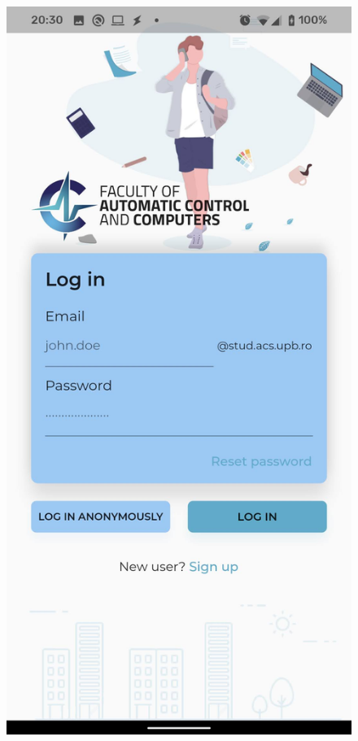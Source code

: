 \begin{figure}[!ht]
    \centering
    \begin{minipage}[b]{0.32\textwidth}
        \captionsetup{justification=centering}
        \includegraphics[width=\textwidth]{figures/app/flutter/login.jpg}

\end{minipage}
\end{figure}
